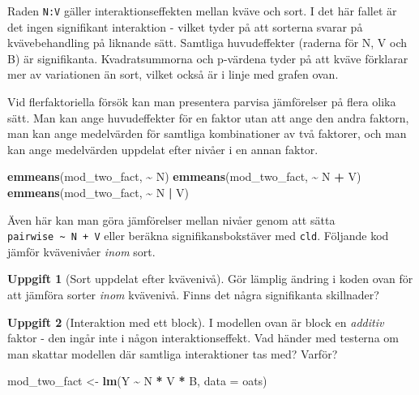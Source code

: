 \documentclass[
]{book}
\newenvironment{Shaded}{\begin{snugshade}}{\end{snugshade}}
\newcommand{\AttributeTok}[1]{\textcolor[rgb]{0.13,0.29,0.53}{#1}}
\newcommand{\FunctionTok}[1]{\textcolor[rgb]{0.13,0.29,0.53}{\textbf{#1}}}
\newcommand{\NormalTok}[1]{#1}
\newcommand{\OtherTok}[1]{\textcolor[rgb]{0.56,0.35,0.01}{#1}}
\newcommand{\SpecialCharTok}[1]{\textcolor[rgb]{0.81,0.36,0.00}{\textbf{#1}}}
\theoremstyle{definition}
\theoremstyle{definition}
\theoremstyle{definition}
\newtheorem{exercise}{Uppgift}[chapter]
\theoremstyle{definition}
\theoremstyle{remark}
\begin{document}
Raden \texttt{N:V} gäller interaktionseffekten mellan kväve och sort. I det här fallet är det ingen signifikant interaktion - vilket tyder på att sorterna svarar på kvävebehandling på liknande sätt. Samtliga huvudeffekter (raderna för N, V och B) är signifikanta. Kvadratsummorna och p-värdena tyder på att kväve förklarar mer av variationen än sort, vilket också är i linje med grafen ovan.

Vid flerfaktoriella försök kan man presentera parvisa jämförelser på flera olika sätt. Man kan ange huvudeffekter för en faktor utan att ange den andra faktorn, man kan ange medelvärden för samtliga kombinationer av två faktorer, och man kan ange medelvärden uppdelat efter nivåer i en annan faktor.

\begin{Shaded}
\begin{Highlighting}[]
\FunctionTok{emmeans}\NormalTok{(mod\_two\_fact, }\SpecialCharTok{\textasciitilde{}}\NormalTok{ N)}
\FunctionTok{emmeans}\NormalTok{(mod\_two\_fact, }\SpecialCharTok{\textasciitilde{}}\NormalTok{ N }\SpecialCharTok{+}\NormalTok{ V)}
\FunctionTok{emmeans}\NormalTok{(mod\_two\_fact, }\SpecialCharTok{\textasciitilde{}}\NormalTok{ N }\SpecialCharTok{|}\NormalTok{ V)}
\end{Highlighting}
\end{Shaded}

Även här kan man göra jämförelser mellan nivåer genom att sätta \texttt{pairwise\ \textasciitilde{}\ N\ +\ V} eller beräkna signifikansbokstäver med \texttt{cld}. Följande kod jämför kvävenivåer \emph{inom} sort.

\begin{exercise}[Sort uppdelat efter kvävenivå]
Gör lämplig ändring i koden ovan för att jämföra sorter \emph{inom} kvävenivå. Finns det några signifikanta skillnader?
\end{exercise}

\begin{exercise}[Interaktion med ett block]

I modellen ovan är block en \emph{additiv} faktor - den ingår inte i någon interaktionseffekt. Vad händer med testerna om man skattar modellen där samtliga interaktioner tas med? Varför?

\begin{Shaded}
\begin{Highlighting}[]
\NormalTok{mod\_two\_fact }\OtherTok{\textless{}{-}} \FunctionTok{lm}\NormalTok{(Y }\SpecialCharTok{\textasciitilde{}}\NormalTok{ N }\SpecialCharTok{*}\NormalTok{ V }\SpecialCharTok{*}\NormalTok{ B, }\AttributeTok{data =}\NormalTok{ oats)}
\end{Highlighting}
\end{Shaded}

\end{exercise}
\end{document}
